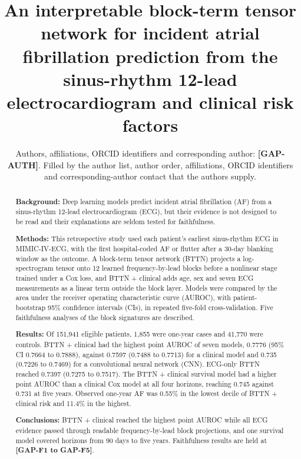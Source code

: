 \documentclass[preprint,12pt]{elsarticle}
\begin{document}
\begin{frontmatter}

\title{An interpretable block-term tensor network for incident atrial fibrillation prediction from the sinus-rhythm 12-lead electrocardiogram and clinical risk factors}

\author{Authors, affiliations, ORCID identifiers and corresponding author: \textbf{[GAP-AUTH]}. Filled by the author list, author order, affiliations, ORCID identifiers and corresponding-author contact that the authors supply.}

\begin{abstract}
\noindent \textbf{Background:} Deep learning models predict incident atrial fibrillation (AF) from a sinus-rhythm 12-lead electrocardiogram (ECG), but their evidence is not designed to be read and their explanations are seldom tested for faithfulness.

\noindent \textbf{Methods:} This retrospective study used each patient's earliest sinus-rhythm ECG in MIMIC-IV-ECG, with the first hospital-coded AF or flutter after a 30-day blanking window as the outcome. A block-term tensor network (BTTN) projects a log-spectrogram tensor onto 12 learned frequency-by-lead blocks before a nonlinear stage trained under a Cox loss, and BTTN + clinical adds age, sex and seven ECG measurements as a linear term outside the block layer. Models were compared by the area under the receiver operating characteristic curve (AUROC), with patient-bootstrap 95\% confidence intervals (CIs), in repeated five-fold cross-validation. Five faithfulness analyses of the block signatures are described.

\noindent \textbf{Results:} Of 151,941 eligible patients, 1,855 were one-year cases and 41,770 were controls. BTTN + clinical had the highest point AUROC of seven models, 0.7776 (95\% CI 0.7664 to 0.7888), against 0.7597 (0.7488 to 0.7713) for a clinical model and 0.735 (0.7226 to 0.7469) for a convolutional neural network (CNN). ECG-only BTTN reached 0.7397 (0.7275 to 0.7517). The BTTN + clinical survival model had a higher point AUROC than a clinical Cox model at all four horizons, reaching 0.745 against 0.731 at five years. Observed one-year AF was 0.55\% in the lowest decile of BTTN + clinical risk and 11.4\% in the highest.

\noindent \textbf{Conclusions:} BTTN + clinical reached the highest point AUROC while all ECG evidence passed through readable frequency-by-lead block projections, and one survival model covered horizons from 90 days to five years. Faithfulness results are held at \textbf{[GAP-F1 to GAP-F5]}.


\end{abstract}
\end{frontmatter}
\end{document}
